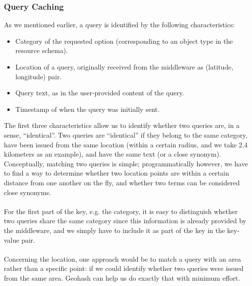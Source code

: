 \subsubsection{Query Caching}
As we mentioned earlier, a query is identified by the following characteristics:
\begin{itemize}
  \item Category of the requested option (corresponding to an object type in the resource schema).
  \item Location of a query, originally received from the middleware as (latitude, longitude) pair.
  \item Query text, as in the user-provided content of the query.
  \item Timestamp of when the query was initially sent.
\end{itemize}
The first three characteristics allow us to identify whether two queries are, in a sense, ``identical''. Two queries are ``identical'' if they belong to the same category, have been issued from the same location (within a certain radius, and we take 2.4 kilometers as an example), and have the same text (or a close synonym). Conceptually, matching two queries is simple; programmatically however, we have to find a way to determine whether two location points are within a certain distance from one another on the fly, and whether two terms can be considered close synonyms.\\\\
For the first part of the key, e.g. the category, it is easy to distinguish whether two queries share the same category since this information is already provided by the middleware, and we simply have to include it as part of the key in the key-value pair.\\\\
Concerning the location, one approach would be to match a query with an area rather than a specific point: if we could identify whether two queries were issued from the same area. Geohash can help us do exactly that with minimum effort.

